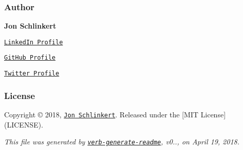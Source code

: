 \subsubsection*{Author}

{\bfseries Jon Schlinkert}


\begin{DoxyItemize}
\item \href{https://linkedin.com/in/jonschlinkert}{\tt Linked\+In Profile}
\item \href{https://github.com/jonschlinkert}{\tt Git\+Hub Profile}
\item \href{https://twitter.com/jonschlinkert}{\tt Twitter Profile}
\end{DoxyItemize}

\subsubsection*{License}

Copyright © 2018, \href{https://github.com/jonschlinkert}{\tt Jon Schlinkert}. Released under the \mbox{[}M\+IT License\mbox{]}(L\+I\+C\+E\+N\+SE).





{\itshape This file was generated by \href{https://github.com/verbose/verb-generate-readme}{\tt verb-\/generate-\/readme}, v0.., on April 19, 2018.} 